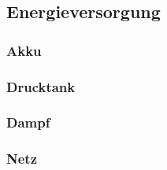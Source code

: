 \subsection{Energieversorgung}

\subsubsection{Akku}

\subsubsection{Drucktank}

\subsubsection{Dampf}

\subsubsection{Netz}